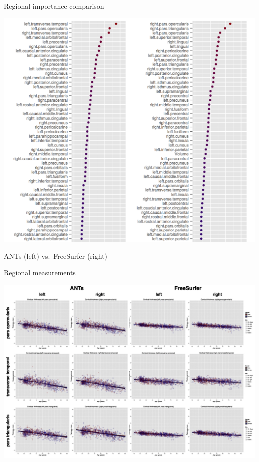 \documentclass[ignorenonframetext,]{beamer}
\begin{document}
\begin{frame}{Regional importance comparison}

\includegraphics{./evaluation/figures/antsvfreesurfer_Importance.png}

ANTs (left) vs.~FreeSurfer (right)

\end{frame}

\begin{frame}{Regional measurements}

\includegraphics{./evaluation/figures/antsvfreesurfer_regionalPlots.png}

\end{frame}
\end{document}
